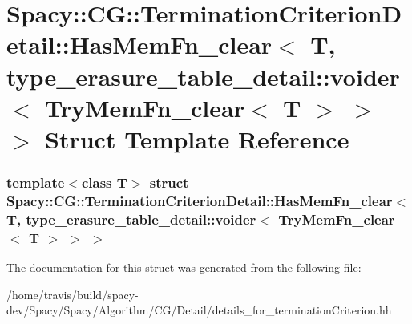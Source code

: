 \hypertarget{structSpacy_1_1CG_1_1TerminationCriterionDetail_1_1HasMemFn__clear_3_01T_00_01type__erasure__tab1c44e4e7361fc3133f029cdfb4ba21a0}{\section{\-Spacy\-:\-:\-C\-G\-:\-:\-Termination\-Criterion\-Detail\-:\-:\-Has\-Mem\-Fn\-\_\-clear$<$ \-T, type\-\_\-erasure\-\_\-table\-\_\-detail\-:\-:voider$<$ \-Try\-Mem\-Fn\-\_\-clear$<$ \-T $>$ $>$ $>$ \-Struct \-Template \-Reference}
\label{structSpacy_1_1CG_1_1TerminationCriterionDetail_1_1HasMemFn__clear_3_01T_00_01type__erasure__tab1c44e4e7361fc3133f029cdfb4ba21a0}
}
\subsubsection*{template$<$class T$>$ struct Spacy\-::\-C\-G\-::\-Termination\-Criterion\-Detail\-::\-Has\-Mem\-Fn\-\_\-clear$<$ T, type\-\_\-erasure\-\_\-table\-\_\-detail\-::voider$<$ Try\-Mem\-Fn\-\_\-clear$<$ T $>$ $>$ $>$}



\-The documentation for this struct was generated from the following file\-:\begin{DoxyCompactItemize}
\item 
/home/travis/build/spacy-\/dev/\-Spacy/\-Spacy/\-Algorithm/\-C\-G/\-Detail/details\-\_\-for\-\_\-termination\-Criterion.\-hh\end{DoxyCompactItemize}
